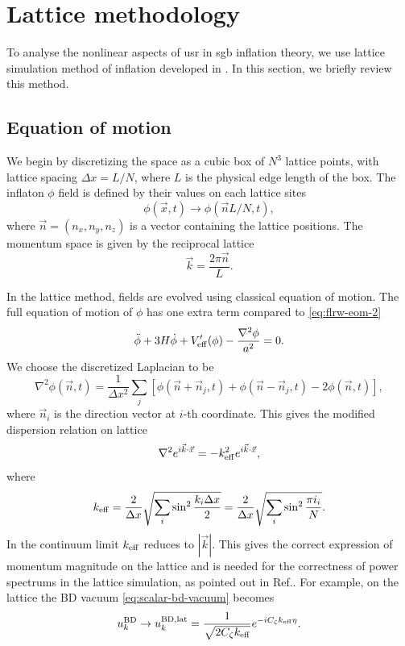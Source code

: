 \documentclass[reprint, 10pt, amsmath, amssymb, floatfix, aps, prd, superscriptaddress, nofootinbib, nobibnotes,twocolumn]{revtex4-1}
\begin{document}
\section{Lattice methodology}
\label{sec:lattice-method}
To analyse the nonlinear aspects of \ac{usr} in \ac{sgb} inflation theory, we use lattice simulation method of inflation developed in \cite{Caravano:2021pgc,Caravano:2022epk}. In this section, we briefly review this method.

\subsection{Equation of motion}
We begin by discretizing the space as a cubic box of $N^3$ lattice points, with lattice spacing $\Delta x = L / N$, where $L$ is the physical edge length of the box. The inflaton $\phi$ field is defined by their values on each lattice sites
\begin{equation}
	\phi(\vec x, t) \to \phi(\vec n L / N, t),
\end{equation}
where $\vec n = (n_x, n_y, n_z)$ is a vector containing the lattice positions. The momentum space is given by the reciprocal lattice
\begin{equation}
	\vec k = \frac{2\pi\vec n}{L}.
\end{equation}

In the lattice method, fields are evolved using classical equation of motion. The full equation of motion of $\phi$ has one extra term compared to \eqref{eq:flrw-eom-2}
\begin{equation}
	\ddot\phi + 3H\dot\phi + V_{\rm eff}'(\phi) - \frac{\nabla^2\phi}{a^2} = 0.
\end{equation}
We choose the discretized Laplacian to be
\begin{equation}
	\nabla^2\phi(\vec n, t) = \frac{1}{\Delta x^2}\sum_j \left[\phi(\vec n + \vec n_j, t) + \phi(\vec n - \vec n_j, t) - 2\phi(\vec n, t)\right],
\end{equation}
where $\vec n_i$ is the direction vector at $i$-th coordinate. This gives the modified dispersion relation on lattice
\begin{equation}
	\nabla^2 e^{i\vec k\cdot\vec x} = -k_{\rm eff}^2 e^{i\vec k\cdot\vec x},
\end{equation}
where
\begin{equation}\label{eq:k-eff}
	k_{\rm eff} = \frac{2}{\Delta x}\sqrt{\sum_i\sin^2\frac{k_i\Delta x}{2}} = \frac{2}{\Delta x}\sqrt{\sum_i\sin^2 \frac{\pi i_i}{N}}.
\end{equation}
In the continuum limit $k_{\rm eff}$ reduces to $|\vec k|$. This gives the correct expression of momentum magnitude on the lattice and is needed for the correctness of power spectrums in the lattice simulation, as pointed out in Ref.\cite{Caravano:2021pgc}. For example, on the lattice the BD vacuum \eqref{eq:scalar-bd-vacuum} becomes
\begin{equation}\label{eq:scalar-bd-vacuum-lat}
	u_k^{\rm BD} \to u_k^{\rm BD, lat} = \frac{1}{\sqrt{2C_\zeta k_{\rm eff}}} e^{-iC_\zeta k_{\rm eff}\eta}.
\end{equation}
\end{document}
